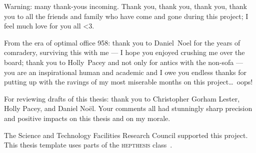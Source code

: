 \begin{acknowledgements}
Warning: many thank-yous incoming.
Thank you, thank you, thank you, thank you
to all the friends and family who have come and gone during this project;
I feel much love for you all <3.

From the era of optimal office 958:
thank you to Daniel~Noel for the years of comradery, surviving this with me
--- I hope you enjoyed crushing me over the board;
thank you to Holly~Pacey and not only for antics with the non-sofa ---
you are an inspirational human and academic and I owe you endless thanks for
putting up with the ravings of my most miserable months on this
project\ldots\ oops!





For reviewing drafts of this thesis:
thank you to
Christopher Gorham Lester,
Holly Pacey, and
Daniel No\"el.
Your comments all had stunningly sharp precision and positive impacts on this
thesis and on my morale.

The Science and Technology Facilities Research Council supported this project.
This thesis template uses parts of the \textsc{hepthesis}
class~\cite{hepthesis}.
\end{acknowledgements}


